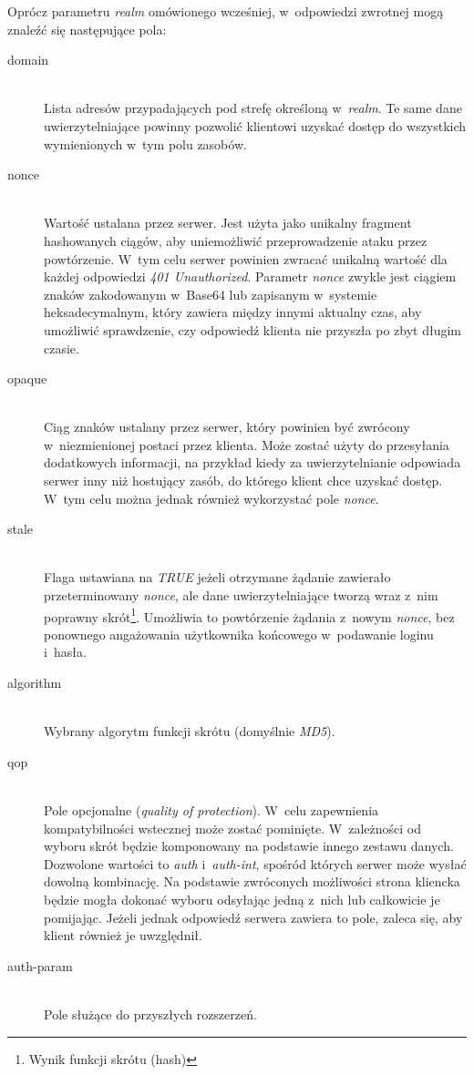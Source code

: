 \documentclass[11pt]{aghdpl}
\begin{document}
Oprócz parametru \emph{realm} omówionego wcześniej, w~odpowiedzi zwrotnej mogą znaleźć się następujące pola:
\begin{description}
\item[domain] \hfill \\
Lista adresów przypadających pod strefę określoną w~\emph{realm}. Te same dane uwierzytelniające powinny pozwolić klientowi uzyskać dostęp do wszystkich wymienionych w~tym polu zasobów.
\item[nonce] \hfill \\
Wartość ustalana przez serwer. Jest użyta jako unikalny fragment hashowanych ciągów, aby uniemożliwić przeprowadzenie ataku przez powtórzenie. W~tym celu serwer powinien zwracać unikalną wartość dla każdej odpowiedzi \emph{401 Unauthorized}. Parametr \emph{nonce} zwykle jest ciągiem znaków zakodowanym w~Base64 lub zapisanym w~systemie heksadecymalnym, który zawiera między innymi aktualny czas, aby umożliwić sprawdzenie, czy odpowiedź klienta nie przyszła po zbyt długim czasie.
\item[opaque] \hfill \\
Ciąg znaków ustalany przez serwer, który powinien być zwrócony w~niezmienionej postaci przez klienta. Może zostać użyty do przesyłania dodatkowych informacji, na przykład kiedy za uwierzytelnianie odpowiada serwer inny niż hostujący zasób, do którego klient chce uzyskać dostęp. W~tym celu można jednak również wykorzystać pole \emph{nonce}.
\item[stale] \hfill \\
Flaga ustawiana na \emph{TRUE} jeżeli otrzymane żądanie zawierało przeterminowany \emph{nonce}, ale dane uwierzytelniające tworzą wraz z~nim poprawny skrót\footnote{Wynik funkcji skrótu (hash)}. Umożliwia to powtórzenie żądania z~nowym \emph{nonce}, bez ponownego angażowania użytkownika końcowego w~podawanie loginu i~hasła.
\item[algorithm] 
\hfill \\Wybrany algorytm funkcji skrótu (domyślnie \emph{MD5}).
\item[qop] \hfill \\
Pole opcjonalne (\emph{quality of protection}). W~celu zapewnienia kompatybilności wstecznej może zostać pominięte. W~zależności od wyboru skrót będzie komponowany na podstawie innego zestawu danych. Dozwolone wartości to \emph{auth} i~\emph{auth-int}, spośród których serwer może wysłać dowolną kombinację. Na podstawie zwróconych możliwości strona kliencka będzie mogła dokonać wyboru odsyłając jedną z~nich lub całkowicie je pomijając. Jeżeli jednak odpowiedź serwera zawiera to pole, zaleca się, aby klient również je uwzględnił.
\item[auth-param] \hfill \\
Pole służące do przyszłych rozszerzeń.
\end{description}
\end{document}
